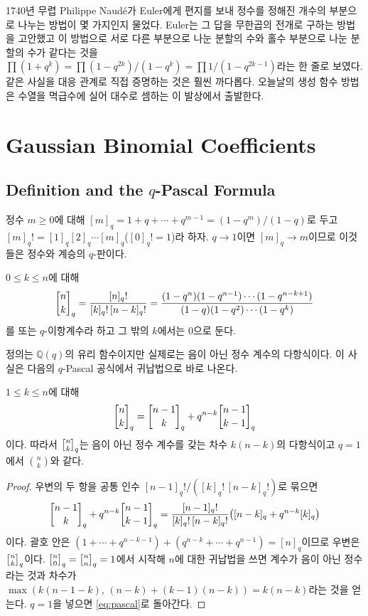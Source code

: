 \begin{aside}[Euler와 분할]
1740년 무렵 Philippe Naudé가 Euler에게 편지를 보내 정수를 정해진 개수의 부분으로 나누는 방법이 몇 가지인지 물었다. Euler는 그 답을 무한곱의 전개로 구하는 방법을 고안했고 이 방법으로 서로 다른 부분으로 나눈 분할의 수와 홀수 부분으로 나눈 분할의 수가 같다는 것을 $\prod(1+q^k)=\prod(1-q^{2k})/(1-q^k)=\prod1/(1-q^{2k-1})$라는 한 줄로 보였다. 같은 사실을 대응 관계로 직접 증명하는 것은 훨씬 까다롭다. 오늘날의 생성 함수 방법은 수열을 멱급수에 실어 대수로 셈하는 이 발상에서 출발한다\cite{andrews1998partitions}.
\end{aside}


\section{Gaussian Binomial Coefficients}
\label{sec:qbinom}

\subsection{Definition and the $q$-Pascal Formula}

정수 $m\ge0$에 대해 $[m]_q=1+q+\cdots+q^{m-1}=(1-q^m)/(1-q)$로 두고 $[m]_q!=[1]_q[2]_q\cdots[m]_q$($[0]_q!=1$)라 하자. $q\to1$이면 $[m]_q\to m$이므로 이것들은 정수와 계승의 $q$-판이다.

\begin{definition}
\label{def:qbinom}
$0\le k\le n$에 대해
\[
\qbinom nk=\frac{[n]_q!}{[k]_q!\,[n-k]_q!}=\frac{(1-q^n)(1-q^{n-1})\cdots(1-q^{n-k+1})}{(1-q)(1-q^2)\cdots(1-q^k)}
\]
를  또는 $q$-이항계수라 하고 그 밖의 $k$에서는 $0$으로 둔다.
\end{definition}

정의는 $\mathbb Q(q)$의 유리 함수이지만 실제로는 음이 아닌 정수 계수의 다항식이다. 이 사실은 다음의 $q$-Pascal 공식에서 귀납법으로 바로 나온다.

\begin{proposition}
\label{prop:qpascal}
$1\le k\le n$에 대해
\begin{equation}
\label{eq:qpascal}
\qbinom nk=\qbinom{n-1}k+q^{n-k}\qbinom{n-1}{k-1}
\end{equation}
이다. 따라서 $\qbinom nk$는 음이 아닌 정수 계수를 갖는 차수 $k(n-k)$의 다항식이고 $q=1$에서 $\binom nk$와 같다.
\end{proposition}

\begin{proof}
우변의 두 항을 공통 인수 $[n-1]_q!/([k]_q!\,[n-k]_q!)$로 묶으면
\[
\qbinom{n-1}k+q^{n-k}\qbinom{n-1}{k-1}=\frac{[n-1]_q!}{[k]_q!\,[n-k]_q!}\bigl([n-k]_q+q^{n-k}[k]_q\bigr)
\]
이다. 괄호 안은 $(1+\cdots+q^{n-k-1})+(q^{n-k}+\cdots+q^{n-1})=[n]_q$이므로 우변은 $\qbinom nk$이다. $\qbinom n0=\qbinom nn=1$에서 시작해 $n$에 대한 귀납법을 쓰면 계수가 음이 아닌 정수라는 것과 차수가 $\max(k(n-1-k),\,(n-k)+(k-1)(n-k))=k(n-k)$라는 것을 얻는다. $q=1$을 넣으면 \cref{eq:pascal}로 돌아간다.
\end{proof}

